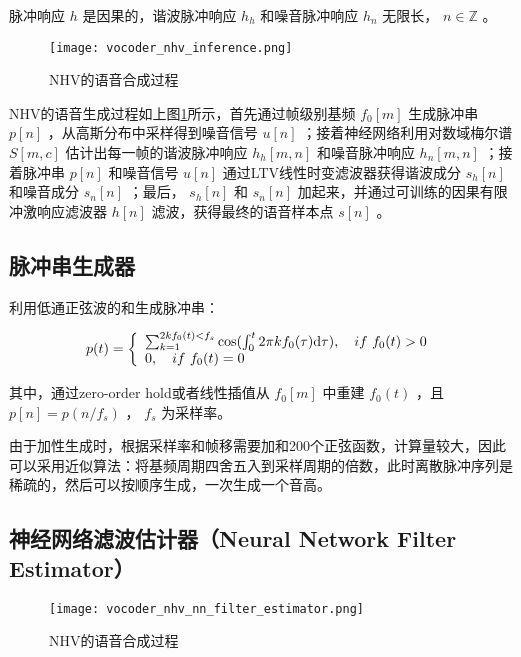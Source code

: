 \documentclass[cn,10pt,math=newtx,citestyle=gb7714-2015,bibstyle=gb7714-2015]{elegantbook}
\begin{document}
脉冲响应 $h$ 是因果的，谐波脉冲响应 $h_h$ 和噪音脉冲响应 $h_n$ 无限长， $n\in \mathbb{Z}$ 。

\begin{figure}[htbp]
  \centering
  \texttt{[image: vocoder\_nhv\_inference.png]}
  \caption{NHV的语音合成过程 \label{fig:vocoder_nhv_inference}}
\end{figure}

NHV的语音生成过程如上图\ref{fig:vocoder_nhv_inference}所示，首先通过帧级别基频 $f_0[m]$ 生成脉冲串 $p[n]$ ，从高斯分布中采样得到噪音信号 $u[n]$ ；接着神经网络利用对数域梅尔谱 $S[m,c]$ 估计出每一帧的谐波脉冲响应 $h_h[m,n]$ 和噪音脉冲响应 $h_n[m,n]$ ；接着脉冲串 $p[n]$ 和噪音信号 $u[n]$ 通过LTV线性时变滤波器获得谐波成分 $s_h[n]$ 和噪音成分 $s_n[n]$ ；最后， $s_h[n]$ 和 $s_n[n]$ 加起来，并通过可训练的因果有限冲激响应滤波器 $h[n]$ 滤波，获得最终的语音样本点 $s[n]$ 。

\subsection{脉冲串生成器}

利用低通正弦波的和生成脉冲串：

\begin{equation}
  p(t)=\left\{\begin{array}{l}
    \sum_{k=1}^{2kf_0(t)<f_s}{\rm cos}(\int_{0}^{t}2\pi k f_0(\tau){\rm d}\tau),\quad if\ f_0(t)>0 \\ 
    0,\quad if\ f_0(t)=0
   \end{array}\right.
\end{equation}


其中，通过zero-order hold或者线性插值从 $f_0[m]$ 中重建 $f_0(t)$ ，且 $p[n]=p(n/f_s)$ ， $f_s$ 为采样率。

由于加性生成时，根据采样率和帧移需要加和200个正弦函数，计算量较大，因此可以采用近似算法：将基频周期四舍五入到采样周期的倍数，此时离散脉冲序列是稀疏的，然后可以按顺序生成，一次生成一个音高。

\subsection{神经网络滤波估计器（Neural Network Filter Estimator）}

\begin{figure}[htbp]
  \centering
  \texttt{[image: vocoder\_nhv\_nn\_filter\_estimator.png]}
  \caption{NHV的语音合成过程 \label{fig:vocoder_nhv_nn_filter_estimator}}
\end{figure}
\end{document}
